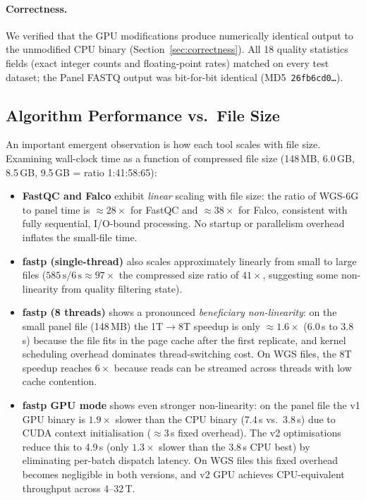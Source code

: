 \documentclass[a4paper,12pt]{article}
\begin{document}
\paragraph{Correctness.}
We verified that the GPU modifications produce numerically identical output to
the unmodified CPU binary (Section~\ref{sec:correctness}).  All 18 quality
statistics fields (exact integer counts and floating-point rates) matched on
every test dataset; the Panel FASTQ output was bit-for-bit identical
(MD5~\texttt{26fb6cd0\ldots}).

\subsection{Algorithm Performance vs.\ File Size}
\label{sec:filesize}

An important emergent observation is how each tool scales with file size.
Examining wall-clock time as a function of compressed file size (148\,MB,
6.0\,GB, 8.5\,GB, 9.5\,GB = ratio 1:41:58:65):

\begin{itemize}
  \item \textbf{FastQC and Falco} exhibit \emph{linear} scaling with file size:
    the ratio of WGS-6G to panel time is ${\approx}28\times$ for FastQC and
    ${\approx}38\times$ for Falco, consistent with fully sequential, I/O-bound
    processing.  No startup or parallelism overhead inflates the small-file time.

  \item \textbf{fastp (single-thread)} also scales approximately linearly from
    small to large files ($585\,\text{s} / 6\,\text{s} \approx 97\times$ the
    compressed size ratio of $41\times$, suggesting some non-linearity from
    quality filtering state).

  \item \textbf{fastp (8 threads)} shows a pronounced \emph{beneficiary
    non-linearity}: on the small panel file (148\,MB) the 1T$\to$8T speedup
    is only ${\approx}1.6\times$ (6.0\,s to 3.8\,s) because the file fits in
    the page cache after the first replicate, and kernel scheduling overhead
    dominates thread-switching cost.  On WGS files, the 8T speedup reaches
    $6\times$ because reads can be streamed across threads with low cache
    contention.

  \item \textbf{fastp GPU mode} shows even stronger non-linearity: on the panel
    file the v1 GPU binary is $1.9\times$ slower than the CPU binary (7.4\,s
    vs.\ 3.8\,s) due to CUDA context initialisation (${{\approx}}3$\,s fixed
    overhead).  The v2 optimisations reduce this to 4.9\,s (only $1.3\times$
    slower than the 3.8\,s CPU best) by eliminating per-batch dispatch latency.
    On WGS files this fixed overhead becomes negligible in both versions, and
    v2 GPU achieves CPU-equivalent throughput across 4--32\,T.
\end{itemize}
\end{document}
